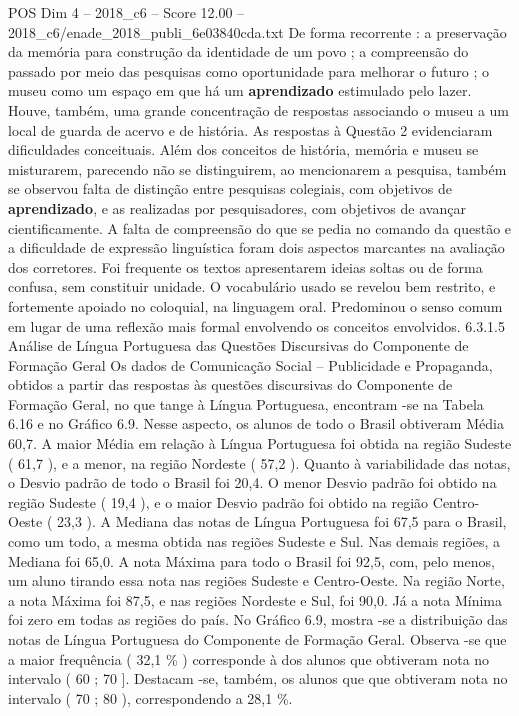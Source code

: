 \begin{textsample}{POS Dim 4 – 2018\_c6 – Score 12.00 – 2018\_c6/enade\_2018\_publi\_6e03840cda.txt}
De forma recorrente : a preservação da memória para construção da identidade de um povo ; a compreensão do passado por meio das pesquisas como oportunidade para melhorar o futuro ; o museu como um espaço em que há um \textbf{aprendizado} estimulado pelo lazer.
Houve, também, uma grande concentração de respostas associando o museu a um local de guarda de acervo e de história.
As respostas à Questão 2 evidenciaram dificuldades conceituais.
Além dos conceitos de história, memória e museu se misturarem, parecendo não se distinguirem, ao mencionarem a pesquisa, também se observou falta de distinção entre pesquisas colegiais, com objetivos de \textbf{aprendizado}, e as realizadas por pesquisadores, com objetivos de avançar cientificamente.
A falta de compreensão do que se pedia no comando da questão e a dificuldade de expressão linguística foram dois aspectos marcantes na avaliação dos corretores.
Foi frequente os textos apresentarem ideias soltas ou de forma confusa, sem constituir unidade.
O vocabulário usado se revelou bem restrito, e fortemente apoiado no coloquial, na linguagem oral.
Predominou o senso comum em lugar de uma reflexão mais formal envolvendo os conceitos envolvidos. 6.3.1.5 Análise de Língua Portuguesa das Questões Discursivas do Componente de Formação Geral Os dados de Comunicação Social – Publicidade e Propaganda, obtidos a partir das respostas às questões discursivas do Componente de Formação Geral, no que tange à Língua Portuguesa, encontram -se na Tabela 6.16 e no Gráfico 6.9.
Nesse aspecto, os alunos de todo o Brasil obtiveram Média 60,7.
A maior Média em relação à Língua Portuguesa foi obtida na região Sudeste ( 61,7 ), e a menor, na região Nordeste ( 57,2 ).
Quanto à variabilidade das notas, o Desvio padrão de todo o Brasil foi 20,4.
O menor Desvio padrão foi obtido na região Sudeste ( 19,4 ), e o maior Desvio padrão foi obtido na região Centro-Oeste ( 23,3 ).
A Mediana das notas de Língua Portuguesa foi 67,5 para o Brasil, como um todo, a mesma obtida nas regiões Sudeste e Sul.
Nas demais regiões, a Mediana foi 65,0.
A nota Máxima para todo o Brasil foi 92,5, com, pelo menos, um aluno tirando essa nota nas regiões Sudeste e Centro-Oeste.
Na região Norte, a nota Máxima foi 87,5, e nas regiões Nordeste e Sul, foi 90,0.
Já a nota Mínima foi zero em todas as regiões do país.
No Gráfico 6.9, mostra -se a distribuição das notas de Língua Portuguesa do Componente de Formação Geral.
Observa -se que a maior frequência ( 32,1 \% ) corresponde à dos alunos que obtiveram nota no intervalo ( 60 ; 70 ].
Destacam -se, também, os alunos que que obtiveram nota no intervalo ( 70 ; 80 ), correspondendo a 28,1 \%.

\end{textsample}
